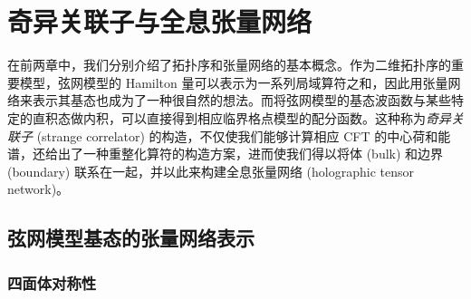 \chapter{奇异关联子与全息张量网络}
\label{chap:strange-correlator}

在前两章中，我们分别介绍了拓扑序和张量网络的基本概念。作为二维拓扑序的重要模型，弦网模型的 Hamilton 量可以表示为一系列局域算符之和，因此用张量网络来表示其基态也成为了一种很自然的想法。而将弦网模型的基态波函数与某些特定的直积态做内积，可以直接得到相应临界格点模型的配分函数。这种称为\emph{奇异关联子} (strange correlator) 的构造，不仅使我们能够计算相应 CFT 的中心荷和能谱，还给出了一种重整化算符的构造方案，进而使我们得以将体 (bulk) 和边界 (boundary) 联系在一起，并以此来构建全息张量网络 (holographic tensor network)。

\section{弦网模型基态的张量网络表示}
\label{sec:string-net-peps}

\subsection{四面体对称性}
\label{subsec:tetrahedral-symmetry}

